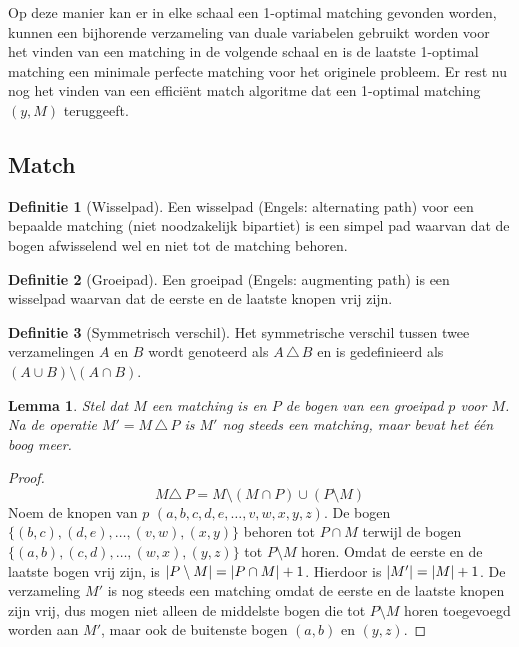 \documentclass[conference]{IEEEtran}
\newtheorem{lemma}{Lemma}[section]
\theoremstyle{definition}
\newtheorem{definition}{Definitie}[section]
\theoremstyle{remark}
\DeclarePairedDelimiter{\card}{\vert}{\vert}  %
\begin{document}
Op deze manier kan er in elke schaal een 1-optimal matching gevonden worden, kunnen een bijhorende verzameling van duale variabelen gebruikt worden voor het vinden van een matching in de volgende schaal en is de laatste 1-optimal matching een minimale perfecte matching voor het originele probleem. Er rest nu nog het vinden van een efficiënt match algoritme dat een 1-optimal matching $(y, M)$ teruggeeft.
    
\subsection{Match}
\begin{definition}[Wisselpad]
    Een wisselpad (Engels: alternating path) voor een bepaalde matching (niet noodzakelijk bipartiet) is een simpel pad waarvan dat de bogen afwisselend wel en niet tot de matching behoren.
\end{definition}

\begin{definition}[Groeipad]
    Een groeipad (Engels: augmenting path) is een wisselpad waarvan dat de eerste en de laatste knopen vrij zijn.
\end{definition}

\begin{definition}[Symmetrisch verschil]
    Het symmetrische verschil tussen twee verzamelingen $A$ en $B$ wordt genoteerd als $A\,\triangle\,B$ en is gedefinieerd als $(A \cup B) \setminus (A \cap B)$.
\end{definition}

\begin{lemma}
    Stel dat $M$ een matching is en $P$ de bogen van een groeipad $p$ voor $M$. Na de operatie $M' = M\, \triangle\, P$ is $M'$ nog steeds een matching, maar bevat het één boog meer.
\end{lemma}
\begin{proof}
    $$M \triangle\, P = M \setminus (M \cap P) \cup (P \setminus M)$$
    Noem de knopen van $p$ $(a, b, c, d, e, \dots, v, w, x, y, z)$. De bogen $\{(b, c), (d, e), \dots, (v, w), (x, y)\}$ behoren tot $P \cap M$ terwijl de bogen $\{(a, b), (c, d), \dots, (w, x), (y, z)\}$ tot $P \setminus M$ horen. Omdat de eerste en de laatste bogen vrij zijn, is $\card{P \setminus M} = \card{P \cap M} + 1$. Hierdoor is $\card{M'} = \card{M} + 1$. De verzameling $M'$ is nog steeds een matching omdat de eerste en de laatste knopen zijn vrij, dus mogen niet alleen de middelste bogen die tot $P \setminus M$ horen toegevoegd worden aan $M'$, maar ook de buitenste bogen $(a, b)$ en $(y, z)$.
\end{proof}
\end{document}
